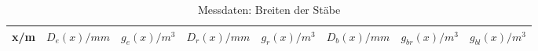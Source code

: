 \begin{table}
  \centering
  \caption{Messdaten: Breiten der Stäbe}
  \label{tab:breiten}
  \begin{tabular}{c c c c c c c c}
    \toprule
    x/m & $D_{e}(x)/mm$	& $g_{e}(x)/m^3$ & $D_{r}(x)/mm$ & $g_{r}(x)/m^3$ & $D_{b}(x)/mm$ & $g_{br}(x)/m^3$ & $g_{bl}(x)/m^3$  \\
    \midrule
      
    \bottomrule
  \end{tabular}
\end{table}
